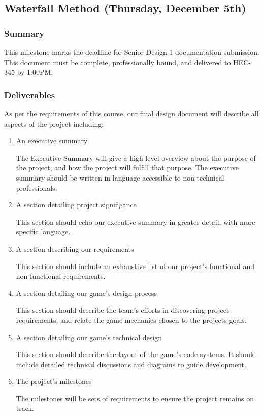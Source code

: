 \subsection{Waterfall Method (Thursday, December 5th)}

\subsubsection*{Summary}
This milestone marks the deadline for Senior Design 1 documentation submission. This document must be complete, professionally bound, and delivered to HEC-345 by 1:00PM.

\subsubsection*{Deliverables}
As per the requirements of this course, our final design document will describe
all aspects of the project including:
\begin{enumerate}
  \item An executive summary
  
  The Executive Summary will give a high level overview about the purpose of the project, and how the project will fulfill that purpose. The executive summary should be written in language accessible to non-technical professionals.

  \item A section detailing project signifigance
  
  This section should echo our executive summary in greater detail, with more specific language.

  \item A section describing our requirements
  
  This section should include an exhaustive list of our project's functional and non-functional requirements.

  \item A section detailing our game's design process
  
  This section should describe the team's efforts in discovering project requirements, and relate the game mechanics chosen to the projects goals.

  \item A section detailing our game's technical design
  
  This section should describe the layout of the game's code systems. It should include detailed technical discussions and diagrams to guide development.

  \item The project's milestones
  
  The milestones will be sets of requirements to ensure the project remains on track.

\end{enumerate}

